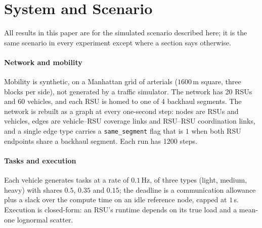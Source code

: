 \section{System and Scenario}
\label{sec:system}

All results in this paper are for the simulated scenario described here; it is the same scenario in every experiment except where a section says otherwise.

\paragraph*{Network and mobility}
Mobility is synthetic, on a Manhattan grid of arterials ($1600$\,m square, three blocks per side), not generated by a traffic simulator.
The network has 20 RSUs and 60 vehicles, and each RSU is homed to one of 4 backhaul segments.
The network is rebuilt as a graph at every one-second step: nodes are RSUs and vehicles, edges are vehicle--RSU coverage links and RSU--RSU coordination links, and a single edge type carries a \texttt{same\_segment} flag that is $1$ when both RSU endpoints share a backhaul segment.
Each run has 1200 steps.

\paragraph*{Tasks and execution}
Each vehicle generates tasks at a rate of $0.1$\,Hz, of three types (light, medium, heavy) with shares $0.5$, $0.35$ and $0.15$; the deadline is a communication allowance plus a slack over the compute time on an idle reference node, capped at $1$\,s.
Execution is closed-form: an RSU's runtime depends on its true load and a mean-one lognormal scatter.

